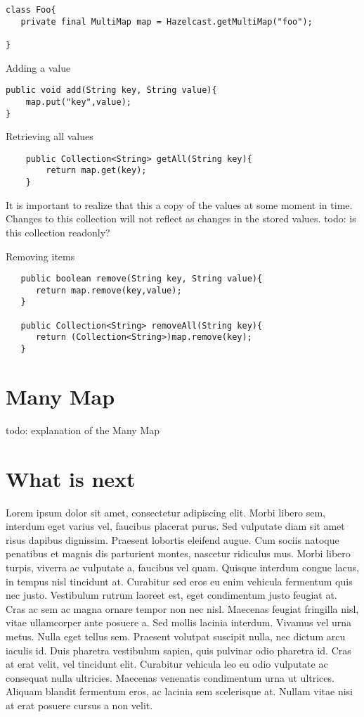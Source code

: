 \begin{verbatim}
class Foo{
   private final MultiMap map = Hazelcast.getMultiMap("foo");
	
}
\end{verbatim}

Adding a value

\begin{verbatim}
public void add(String key, String value){
	map.put("key",value);
}
\end{verbatim}

Retrieving all values

\begin{verbatim}
	public Collection<String> getAll(String key){
		return map.get(key);
	}
\end{verbatim}

It is important to realize that this a copy of the values at some moment in time. Changes to this collection will not reflect as changes in the stored values. todo: is this collection readonly?

Removing items

\begin{verbatim}
   public boolean remove(String key, String value){
      return map.remove(key,value);
   }

   public Collection<String> removeAll(String key){
      return (Collection<String>)map.remove(key);
   }
\end{verbatim}

\section{Many Map}

todo: explanation of the Many Map

\section{What is next}
Lorem ipsum dolor sit amet, consectetur adipiscing elit. Morbi libero sem,
interdum eget varius vel, faucibus placerat purus. Sed vulputate diam sit amet
risus dapibus dignissim. Praesent lobortis eleifend augue. Cum sociis natoque
penatibus et magnis dis parturient montes, nascetur ridiculus mus. Morbi libero
turpis, viverra ac vulputate a, faucibus vel quam. Quisque interdum congue
lacus, in tempus nisl tincidunt at. Curabitur sed eros eu enim vehicula
fermentum quis nec justo. Vestibulum rutrum laoreet est, eget condimentum justo
feugiat at. Cras ac sem ac magna ornare tempor non nec nisl. Maecenas feugiat
fringilla nisl, vitae ullamcorper ante posuere a. Sed mollis lacinia interdum.
Vivamus vel urna metus. Nulla eget tellus sem. Praesent volutpat suscipit nulla,
nec dictum arcu iaculis id. Duis pharetra vestibulum sapien, quis pulvinar odio
pharetra id. Cras at erat velit, vel tincidunt elit. Curabitur vehicula leo eu
odio vulputate ac consequat nulla ultricies. Maecenas venenatis condimentum
urna ut ultrices. Aliquam blandit fermentum eros, ac lacinia sem scelerisque
at. Nullam vitae nisi at erat posuere cursus a non velit.